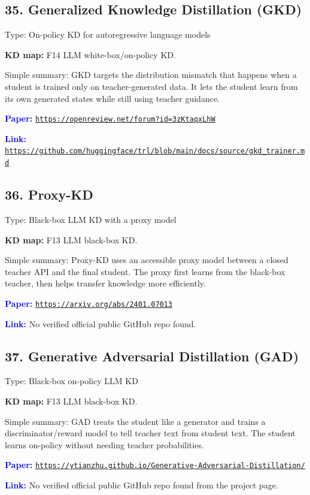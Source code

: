 \documentclass[10pt]{article}
\begin{document}
\subsection*{35. Generalized Knowledge Distillation (GKD)}
Type: On-policy KD for autoregressive language models\par
\textbf{KD map:} F14 LLM white-box/on-policy KD.\par
Simple summary: GKD targets the distribution mismatch that happens when a student is trained only on teacher-generated data. It lets the student learn from its own generated states while still using teacher guidance.\par
\textcolor{blue}{\textbf{Paper:}} \href{https://openreview.net/forum?id=3zKtaqxLhW}{\nolinkurl{https://openreview.net/forum?id=3zKtaqxLhW}}\par
\textcolor{blue}{\textbf{Link:}} \href{https://github.com/huggingface/trl/blob/main/docs/source/gkd_trainer.md}{\nolinkurl{https://github.com/huggingface/trl/blob/main/docs/source/gkd_trainer.md}}\par

\subsection*{36. Proxy-KD}
Type: Black-box LLM KD with a proxy model\par
\textbf{KD map:} F13 LLM black-box KD.\par
Simple summary: Proxy-KD uses an accessible proxy model between a closed teacher API and the final student. The proxy first learns from the black-box teacher, then helps transfer knowledge more efficiently.\par
\textcolor{blue}{\textbf{Paper:}} \href{https://arxiv.org/abs/2401.07013}{\nolinkurl{https://arxiv.org/abs/2401.07013}}\par
\textcolor{blue}{\textbf{Link:}} No verified official public GitHub repo found.\par

\subsection*{37. Generative Adversarial Distillation (GAD)}
Type: Black-box on-policy LLM KD\par
\textbf{KD map:} F13 LLM black-box KD.\par
Simple summary: GAD treats the student like a generator and trains a discriminator/reward model to tell teacher text from student text. The student learns on-policy without needing teacher probabilities.\par
\textcolor{blue}{\textbf{Paper:}} \href{https://ytianzhu.github.io/Generative-Adversarial-Distillation/}{\nolinkurl{https://ytianzhu.github.io/Generative-Adversarial-Distillation/}}\par
\textcolor{blue}{\textbf{Link:}} No verified official public GitHub repo found from the project page.\par
\end{document}
